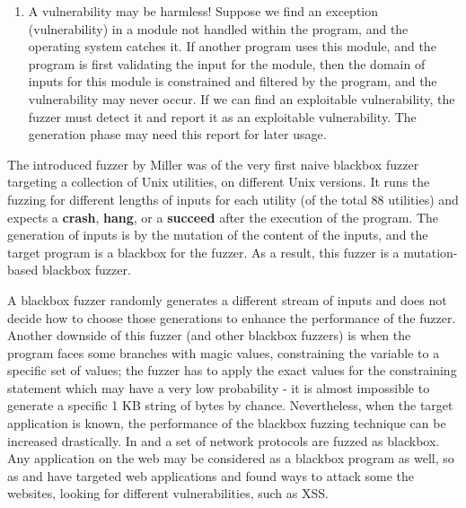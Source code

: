 \begin{enumerate}
    \item A vulnerability may be harmless! Suppose we find an exception (vulnerability) in a module not handled within the program, and the operating system catches it. If another program uses this module, and the program is first validating the input for the module, then the domain of inputs for this module is constrained and filtered by the program, and the vulnerability may never occur. If we can find an exploitable vulnerability, the fuzzer must detect it and report it as an exploitable vulnerability. The generation phase may need this report for later usage.

\end{enumerate}

\vspace{1.5\baselineskip}





The introduced fuzzer by Miller \cite{miller1990empirical} was of the very first naive blackbox fuzzer targeting a collection of Unix utilities, on different Unix versions. It runs the fuzzing for different lengths of inputs for each utility (of the total 88 utilities) and expects a \textbf{crash}, \textbf{hang}, or a \textbf{succeed} after the execution of the program. The generation of inputs is by the mutation of the content of the inputs, and the target program is a blackbox for the fuzzer. As a result, this fuzzer is a mutation-based blackbox fuzzer.


\vspace{1.5\baselineskip}

A blackbox fuzzer randomly generates a different stream of inputs and does not decide how to choose those generations to enhance the performance of the fuzzer. Another downside of this fuzzer (and other blackbox fuzzers) is when the program faces some branches with magic values, constraining the variable to a specific set of values; the fuzzer has to apply the exact values for the constraining statement which may have a very low probability - it is almost impossible to generate a specific 1 KB string of bytes by chance. Nevertheless, when the target application is known, the performance of the blackbox fuzzing technique can be increased drastically. In \cite{banks2006snooze} and \cite{gascon2015pulsar} a set of network protocols are fuzzed as blackbox. Any application on the web may be considered as a blackbox program as well, so as \cite{doupe2012enemy} and \cite{duchene2012xss} have targeted web applications and found ways to attack some the websites, looking for different vulnerabilities, such as XSS.


